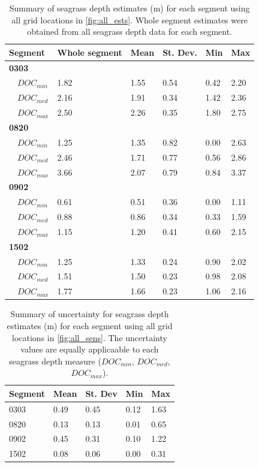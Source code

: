 \documentclass[letterpaper,12pt,oneside]{article}\usepackage[]{graphicx}\usepackage[]{color}
\begin{document}
\begin{table}[!tbp]
\caption{Summary of seagrass depth estimates (m) for each segment using all grid locations in \cref{fig:all_ests}.  Whole segment estimates were obtained from all seagrass depth data for each segment.\label{tab:est_summ}} 
\begin{center}
\begin{tabular}{llllll}
\hline\hline
\multicolumn{1}{l}{{\bf Segment}}&\multicolumn{1}{c}{Whole segment}&\multicolumn{1}{c}{Mean}&\multicolumn{1}{c}{St. Dev.}&\multicolumn{1}{c}{Min}&\multicolumn{1}{c}{Max}\tabularnewline
\hline
{\bfseries 0303}&&&&&\tabularnewline
~~$DOC_{min}$&1.82&1.55&0.54&0.42&2.20\tabularnewline
~~$DOC_{med}$&2.16&1.91&0.34&1.42&2.36\tabularnewline
~~$DOC_{max}$&2.50&2.26&0.35&1.80&2.75\tabularnewline
\hline
{\bfseries 0820}&&&&&\tabularnewline
~~$DOC_{min}$&1.25&1.35&0.82&0.00&2.63\tabularnewline
~~$DOC_{med}$&2.46&1.71&0.77&0.56&2.86\tabularnewline
~~$DOC_{max}$&3.66&2.07&0.79&0.84&3.37\tabularnewline
\hline
{\bfseries 0902}&&&&&\tabularnewline
~~$DOC_{min}$&0.61&0.51&0.36&0.00&1.11\tabularnewline
~~$DOC_{med}$&0.88&0.86&0.34&0.33&1.59\tabularnewline
~~$DOC_{max}$&1.15&1.20&0.41&0.60&2.15\tabularnewline
\hline
{\bfseries 1502}&&&&&\tabularnewline
~~$DOC_{min}$&1.25&1.33&0.24&0.90&2.02\tabularnewline
~~$DOC_{med}$&1.51&1.50&0.23&0.98&2.08\tabularnewline
~~$DOC_{max}$&1.77&1.66&0.23&1.06&2.16\tabularnewline
\hline
\end{tabular}\end{center}

\end{table}


\begin{table}[!tbp]
\caption{Summary of uncertainty for seagrass depth estimates (m) for each segment using all grid locations in \cref{fig:all_sens}.  The uncertainty values are equally applicaable to each seagrass depth measure ($DOC_{min}$, $DOC_{med}$, $DOC_{max}$).\label{tab:sens_summ}} 
\begin{center}
\begin{tabular}{lllll}
\hline\hline
\multicolumn{1}{l}{Segment}&\multicolumn{1}{c}{Mean}&\multicolumn{1}{c}{St. Dev}&\multicolumn{1}{c}{Min}&\multicolumn{1}{c}{Max}\tabularnewline
\hline
0303&0.49&0.45&0.12&1.63\tabularnewline
0820&0.13&0.13&0.01&0.65\tabularnewline
0902&0.45&0.31&0.10&1.22\tabularnewline
1502&0.08&0.06&0.00&0.31\tabularnewline
\hline
\end{tabular}\end{center}

\end{table}
\end{document}
